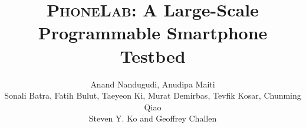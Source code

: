 



\title{\textsc{\LARGE PhoneLab}: A Large-Scale Programmable Smartphone
Testbed}


\author{
\alignauthor
Anand Nandugudi, Anudipa Maiti\\
Sonali Batra, Fatih Bulut, Taeyeon Ki, Murat Demirbas, Tevfik Kosar, Chunming
Qiao\\
Steven Y. Ko and Geoffrey Challen\\[0.1in]
\\
\\
}

\maketitle

\begin{abstract}

\end{abstract}




{\footnotesize


}



